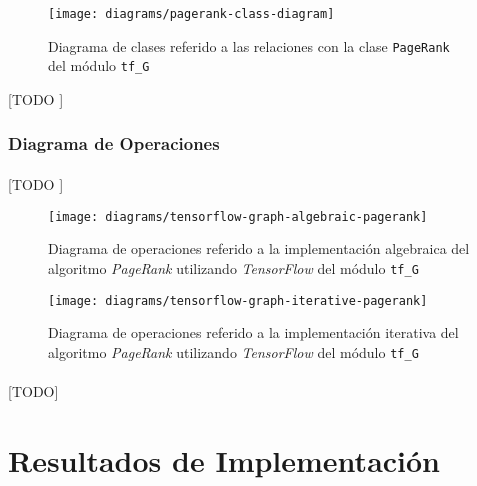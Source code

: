 \documentclass{subfiles}
\begin{document}
          \begin{figure}[h]
            \centering
            \texttt{[image: diagrams/pagerank-class-diagram]}
            \caption{Diagrama de clases referido a las relaciones con la clase \texttt{PageRank} del módulo \texttt{tf\_G}}
            \label{img:pagerank_diagram}
          \end{figure}
          [TODO ]


        \subsubsection{Diagrama de Operaciones}
        \label{sec:operations_diagram}

          \paragraph{}
          [TODO ]

          \begin{figure}[h]
            \centering
            \texttt{[image: diagrams/tensorflow-graph-algebraic-pagerank]}
            \caption{Diagrama de operaciones referido a la implementación algebraica del algoritmo \emph{PageRank} utilizando \emph{TensorFlow} del módulo \texttt{tf\_G}}
            \label{img:pagerank_algebraic_diagram}
          \end{figure}

          \begin{figure}[h]
            \centering
            \texttt{[image: diagrams/tensorflow-graph-iterative-pagerank]}
            \caption{Diagrama de operaciones referido a la implementación iterativa del algoritmo \emph{PageRank} utilizando \emph{TensorFlow} del módulo \texttt{tf\_G}}
            \label{img:pagerank_iterative_diagram}
          \end{figure}

      \paragraph{}
      [TODO]

    \section{Resultados de Implementación}
    \label{sec:implementation_results}
\end{document}
